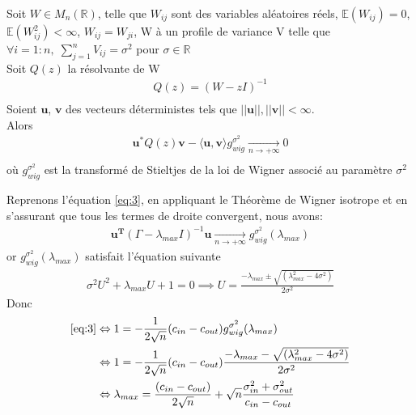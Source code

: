 \begin{theorem}
Soit $W \in M_{n}(\mathbb{R})$, telle que $W_{ij}$ sont des variables aléatoires réels, $\mathbb{E}(W_{ij}) = 0$, $\mathbb{E}(W_{ij}^2) < \infty$, $W_{ij} = W_{ji}$, W à un profile de variance V telle que $\forall i = 1:n , \; \sum_{j=1}^{n}V_{ij} = \sigma^2$ pour $\sigma \in \mathbb{R}$\\
Soit $Q(z)$ la résolvante de W
\begin{align*} 
Q(z) = (W - zI)^{-1}\\
\end{align*}
Soient $\mathbf{u}$, $\mathbf{v}$ des vecteurs déterministes tels que $||\mathbf{u}||, ||\mathbf{v}|| < \infty$.\\
Alors 
\begin{align*} 
\mathbf{u}^*Q(z)\mathbf{v} - \langle \mathbf{u}, \mathbf{v} \rangle g_{wig}^{\sigma^2} \xrightarrow[n \to +\infty]{} 0\\
\end{align*}
où $g_{wig}^{\sigma^2}$ est la transformé de Stieltjes de la loi de Wigner associé au paramètre $\sigma^2$\\
\end{theorem}

Reprenons l’équation \eqref{eq:3}, en appliquant le Théorème de Wigner isotrope et en s'assurant que tous les termes de droite convergent, nous avons:
\begin{align*}
\mathbf{u^T}(\Gamma - \lambda_{max}I)^{-1}\mathbf{u} \xrightarrow[n \to +\infty]{} g_{wig}^{\sigma^2}(\lambda_{max})
\end{align*}
or $g_{wig}^{\sigma^2}(\lambda_{max})$ satisfait l'équation suivante 
\begin{align}
	\sigma^2U^2+\lambda_{max}U+1=0 \implies U = \frac{- \lambda_{max} \pm \sqrt{(\lambda_{max}^2 - 4\sigma^2)}}{2\sigma^2}
\end{align}
Donc
\begin{align}
	\eqref{eq:3} &\Leftrightarrow1 = -\frac{1}{2\sqrt{n}}(c_{in} - c_{out}) g_{wig}^{\sigma^2}(\lambda_{max}) \nonumber\\
	&\Leftrightarrow 1 = -\frac{1}{2\sqrt{n}}(c_{in} - c_{out}) \frac{- \lambda_{max} - \sqrt{(\lambda_{max}^2 - 4\sigma^2)}}{2\sigma^2} \nonumber\\
	&\Leftrightarrow \lambda_{max} = \frac{(c_{in} - c_{out})}{2\sqrt{n}} + \sqrt{n}\frac{\sigma_{in}^2 + \sigma_{out}^2}{c_{in} - c_{out}}
\end{align}

